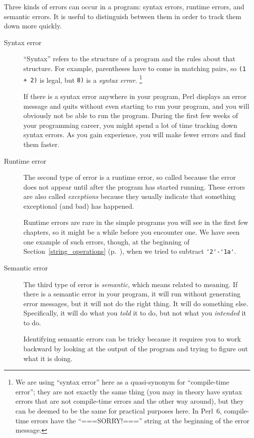Three kinds of errors can occur in a program: syntax errors, runtime 
errors, and semantic errors.  It is useful
to distinguish between them in order to track them down more quickly.

\begin{description}

\item[Syntax error] ``Syntax'' refers to the structure of a program
  and the rules about that structure.  For example, parentheses have
  to come in matching pairs, so {\tt (1 + 2)} is legal, but 
{\tt 8)} is a \emph{syntax error}. \footnote{We are using 
``syntax error'' here as a quasi-synonym for ``compile-time error''; 
they are not exactly the same thing (you may in theory have 
syntax errors that are not compile-time errors and the other way 
around), but they can be deemed to be the same for 
practical purposes here. In Perl~6, compile-time errors 
have the ``===SORRY!==='' string at the beginning of 
the error message.}


If there is a syntax error
anywhere in your program, Perl displays an error message and quits 
without even starting to run your program, and you will 
obviously not be able to run the program.  During the first few
weeks of your programming career, you might spend a lot of
time tracking down syntax errors.  As you gain experience, you will
make fewer errors and find them faster.


\item[Runtime error] The second type of error is a runtime error, so
  called because the error does not appear until after the program has
  started running.  These errors are also called \emph{exceptions}
  because they usually indicate that something exceptional (and bad)
  has happened.   
    

Runtime errors are rare in the simple programs you will see in the
first few chapters, so it might be a while before you encounter one. 
We have seen one example of such errors, though, at the beginning 
of Section~\ref{string_operations} (p.~\pageref{string_operations}), 
when we tried to subtract \verb"'2'-'1a'". 


\item[Semantic error] The third type of error is \emph{semantic}, which
  means related to meaning.  If there is a semantic error in your
  program, it will run without generating error messages, but it will
  not do the right thing.  It will do something else.  Specifically,
  it will do what you \emph{told} it to do, but not what you 
  \emph{intended} it to do.
   

Identifying semantic errors can be tricky because it requires you to work
backward by looking at the output of the program and trying to figure
out what it is doing.

\end{description}


